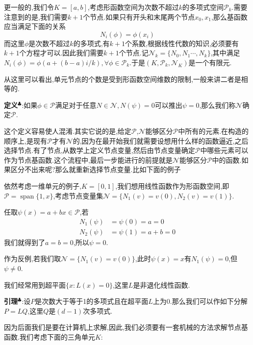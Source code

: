 更一般的,我们令$K=[a,b]$,考虑形函数空间为次数不超过$k$的多项式空间$\mathcal{P}_k$.需要注意到的是,我们需要$k+1$个节点.如果只有开头和末尾两个节点$x_0,x_1$,那么基函数应当满足下面的关系
$$
N_i(\phi)=\phi(x_i)
$$
而这里$\phi$是次数不超过$k$的多项式,有$k+1$个系数,根据线性代数的知识,必须要有$k+1$个方程才可以.因此我们需要$k+1$个节点.记$\mathcal{N}_k=\{N_0,N_1\cdots,N_k\}$,其中满足$N_i(\phi)=\phi(a+(b-a)i/k),\forall \phi\in\mathcal{P}_k$.于是$(K,\mathcal{P}_k,\mathcal{N}_K)$是一个有限元.\par
从这里可以看出,单元节点的个数是受到形函数空间维数的限制,一般来讲二者是相等的.\par
\textbf{定义}$^\clubsuit $:如果$\phi\in\mathcal{P}$满足对于任意$N\in\mathcal{N},N(\psi)=0$可以推出$\psi=0$,那么我们称$\mathcal{N}$确定$\mathcal{P}$.\par
这个定义容易使人混淆.其实它说的是,给定$\mathcal{P}$,$\mathcal{N}$能够区分$\mathcal{P}$中所有的元素.在构造的顺序上,是现有$\mathcal{P}$才有$\mathcal{N}$的,因为在最开始我们就需要设想用什么样的函数逼近,之后选择节点.有了节点,从数学上定义节点变量,然后由节点变量确定$\mathcal{P}$中哪些元素可以作为节点基函数.这个流程中,最后一步能进行的前提就是$\mathcal{N}$能够区分$\mathcal{P}$中的函数.如果区分不出来呢?那么就重新选择节点变量.比如下面的例子\par
依然考虑一维单元的例子,$K=[0,1]$,我们想用线性函数作为形函数空间,即$\mathcal{P}=\operatorname{span}\{1,x\}$,考虑节点变量集$\mathcal{N}=\{N_1(v)=v(0),N_2(v)=v(1)\}$.\par
任取$\psi(x)=a+bx\in\mathcal{P}$,若
$$
\begin{aligned}
    N_1(\psi) &=\psi(0)=a=0\\
    N_2(\psi) &=\psi(1)=a+b=0
\end{aligned}
$$
我们就得到了$a=b=0$,所以$\psi=0$.\par
作为反例,若我们取$\mathcal{N}=\{N_1(v)=v(0)\}$,此时$\psi(x)=x$有$N_1(\psi)=0$,但$\psi\neq 0$.\par
我们经常用到超平面$\{x:L(x)=0\}$,这里$L$是非退化线性函数.\par
\textbf{引理}$^\clubsuit $:设$P$是次数大于等于1的多项式且在超平面$L$上为$0$.那么我们可以作如下分解$P=LQ$,这里$Q$是$(d-1)$次多项式.\par
因为后面我们是要在计算机上求解,因此,我们必须要有一套机械的方法求解节点基函数.我们考虑下面的三角单元$K$:

